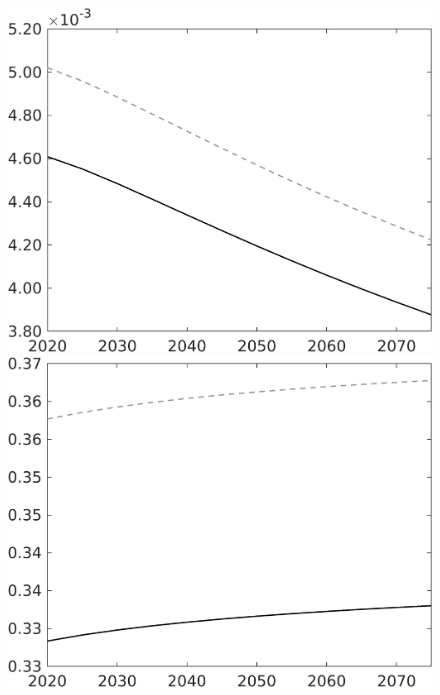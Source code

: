 \documentclass[12pt]{article}
\begin{document}
\begin{figure}[h!!]
\begin{minipage}[]{0.32\textwidth}
\end{minipage}	
\begin{minipage}[]{0.32\textwidth}
\includegraphics[width=1\textwidth]{../../codding_model/own_basedOnFried/optimalPol_010922_revision/figures/all_13Sept22/CompTaul_Equlab_LFBAU_Reg0_Lg_spillover0_nsk1_xgr1_knspil0_sep1_countec0_GovRev0_etaa0.79_lgd0.png}
\end{minipage}	
\begin{minipage}[]{0.32\textwidth}
\includegraphics[width=1\textwidth]{../../codding_model/own_basedOnFried/optimalPol_010922_revision/figures/all_13Sept22/CompTaul_Equlab_LFBAU_Reg0_Ln_spillover0_nsk1_xgr1_knspil0_sep1_countec0_GovRev0_etaa0.79_lgd0.png}

\end{minipage}
\end{figure}
\end{document}
